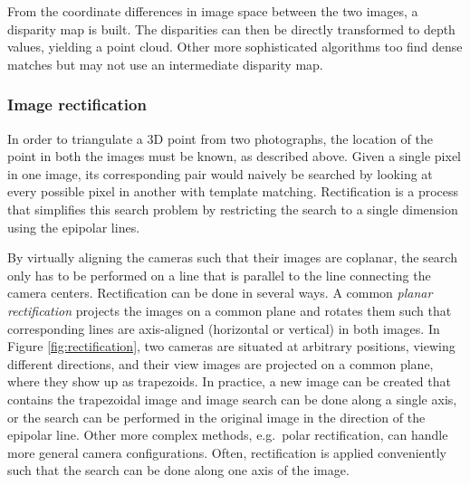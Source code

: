 From the coordinate differences in image space between the two images, a disparity map is built.
The disparities can then be directly transformed to depth values, yielding a point cloud.
Other more sophisticated algorithms too find dense matches but may not use an intermediate disparity map.


\subsubsection{Image rectification} %


In order to triangulate a 3D point from two photographs, the location of the point in both the images must be known, as described above.
Given a single pixel in one image, its corresponding pair would naively be searched by looking at every possible pixel in another with template matching.
Rectification is a process that simplifies this search problem by restricting the search to a single dimension using the epipolar lines.
\cite[p. 157]{trucco1998introductory} \cite[ch. 7.1]{pollefeys2004visual}

By virtually aligning the cameras such that their images are coplanar, the search only has to be performed on a line that is parallel to the line connecting the camera centers.
Rectification can be done in several ways.
A common \emph{planar rectification} projects the images on a common plane and rotates them such that corresponding lines are axis-aligned (horizontal or vertical) in both images. \cite{hartley03multiview}
In Figure \ref{fig:rectification}, two cameras are situated at arbitrary positions, viewing different directions, and their view images are projected on a common plane, where they show up as trapezoids.
In practice, a new image can be created that contains the trapezoidal image and image search can be done along a single axis, or the search can be performed in the original image in the direction of the epipolar line.
Other more complex methods, e.g.\ polar rectification, can handle more general camera configurations. \cite{pollefeys2004visual}
Often, rectification is applied conveniently such that the search can be done along one axis of the image.



